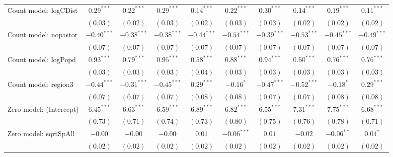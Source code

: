 \begin{table}
\begin{center}
{\begin{tabular}{l c c c c c c c c c}
Count model: logCDist          & $0.29^{***}$  & $0.22^{***}$  & $0.29^{***}$  & $0.14^{***}$  & $0.22^{***}$    & $0.30^{***}$    & $0.14^{***}$  & $0.19^{***}$   & $0.11^{***}$  \\
                               & $(0.03)$      & $(0.02)$      & $(0.03)$      & $(0.02)$      & $(0.03)$        & $(0.03)$        & $(0.02)$      & $(0.02)$       & $(0.02)$      \\
Count model: nopastor          & $-0.40^{***}$ & $-0.38^{***}$ & $-0.38^{***}$ & $-0.44^{***}$ & $-0.54^{***}$   & $-0.39^{***}$   & $-0.53^{***}$ & $-0.45^{***}$  & $-0.49^{***}$ \\
                               & $(0.07)$      & $(0.07)$      & $(0.07)$      & $(0.07)$      & $(0.07)$        & $(0.07)$        & $(0.07)$      & $(0.07)$       & $(0.07)$      \\
Count model: logPopd           & $0.93^{***}$  & $0.79^{***}$  & $0.95^{***}$  & $0.58^{***}$  & $0.88^{***}$    & $0.94^{***}$    & $0.50^{***}$  & $0.76^{***}$   & $0.76^{***}$  \\
                               & $(0.03)$      & $(0.03)$      & $(0.03)$      & $(0.04)$      & $(0.03)$        & $(0.03)$        & $(0.03)$      & $(0.03)$       & $(0.03)$      \\
Count model: region3           & $-0.44^{***}$ & $-0.31^{***}$ & $-0.45^{***}$ & $0.29^{***}$  & $-0.16^{*}$     & $-0.47^{***}$   & $-0.52^{***}$ & $-0.18^{*}$    & $0.29^{***}$  \\
                               & $(0.07)$      & $(0.07)$      & $(0.07)$      & $(0.08)$      & $(0.08)$        & $(0.07)$        & $(0.07)$      & $(0.08)$       & $(0.08)$      \\
Zero model: (Intercept)        & $6.45^{***}$  & $6.63^{***}$  & $6.59^{***}$  & $6.89^{***}$  & $6.82^{***}$    & $6.55^{***}$    & $7.31^{***}$  & $7.75^{***}$   & $6.68^{***}$  \\
                               & $(0.73)$      & $(0.71)$      & $(0.74)$      & $(0.73)$      & $(0.80)$        & $(0.75)$        & $(0.76)$      & $(0.78)$       & $(0.71)$      \\
Zero model: sqrtSpAll          & $-0.00$       & $-0.00$       & $-0.00$       & $0.01$        & $-0.06^{***}$   & $0.01$          & $-0.02$       & $-0.06^{**}$   & $0.04^{*}$    \\
                               & $(0.02)$      & $(0.02)$      & $(0.02)$      & $(0.02)$      & $(0.02)$        & $(0.02)$        & $(0.02)$      & $(0.02)$       & $(0.02)$      \\

\end{tabular}}
\end{center}
\end{table}
